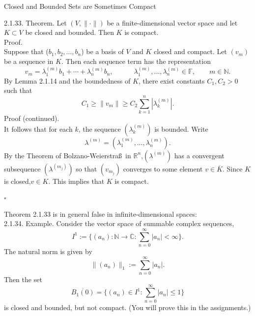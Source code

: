 \documentclass[smaller,hyperref={CJKbookmarks=true}]{beamer}
\newcommand{\C}{\mathbb{C}} \newcommand{\F}{\mathbb{F}} \newcommand{\R}{\mathbb{R}} \newcommand{\Q}{\mathbb{Q}}
\newcommand{\N}{\mathbb{N}}
\newcommand{\myseries}[2]{$#1_1,#1_2,\dots,#1_#2$}
\begin{document}
\begin{frame}{Closed and Bounded Sets are Sometimes Compact}
\begin{spacing}{1.1}
\alert{2.1.33. Theorem.} Let $(V,\|\cdot\|)$ be a \textcolor[rgb]{1.00,0.00,0.00}{finite-dimensional} vector space and let $K\subset V$ be closed and bounded. Then $K$ is compact.\\[7pt]
\alert{Proof.}\\
Suppose that (\myseries{b}{n}) be a basis of $V$ and $K$ closed and compact. Let $(v_m)$ be a sequence in $K$. Then each sequence term has the representation
\[v_m=\lambda_1^{(m)}b_1+\cdots+\lambda_n^{(m)}b_n,\qquad\quad
\lambda_1^{(m)},\ldots,\lambda_n^{(m)}\in\F,\qquad m\in\N.\]
By Lemma 2.1.14 and the boundedness of $K$, there exist constants $C_1,C_2>0$ such that
\[C_1\geq\|v_m\|\geq C_2\sum_{k=1}^{n}|\lambda_k^{(m)}|.\]
\newpage
\alert{Proof (continued).}\\
It follows that for each $k$, the sequence $(\lambda_k^{(m)})$ is bounded. Write
\[\lambda^{(m)}=(\lambda_1^{(m)},\ldots,\lambda_n^{(m)}).\]
By the Theorem of Bolzano-Weierstra\ss~in $\R^n$,$(\lambda^{(m)})$ has a convergent subsequence $(\lambda^{(m_j)})$ so that $(v_{m_j})$ converges to some element $v\in\overline{K}$. Since $K$ is closed,$v\in K$. This implies that $K$ is compact.
\begin{flushright}
  $\square$
\end{flushright}
\newpage
Theorem 2.1.33 is in general false in infinite-dimensional spaces:\\[5pt]
\alert{2.1.34. Example.} Consider the vector space of summable complex sequences,
\[I^1:=\Big\{(a_n):\N\to\C:\sum_{n=0}^{\infty}|a_n|<\infty\Big\}.\]
The natural norm is given by
\[\|(a_n)\|_1:=\sum_{n=0}^{\infty}|a_n|.\]
Then the set
\[\overline{B_1(0)}=\Big\{(a_n)\in I^1:\sum_{n=0}^{\infty}|a_n|\leq1\Big\}\]
is closed and bounded, but not compact. (You will prove this in the
assignments.)
\end{spacing}
\end{frame}
\end{document}

